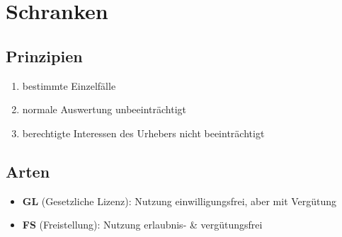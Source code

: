 \documentclass{article}
\begin{document}
\section{Schranken}

\subsection{Prinzipien}
\begin{enumerate}
  \item bestimmte Einzelfälle
  \item normale Auswertung unbeeinträchtigt
  \item berechtigte Interessen des Urhebers nicht beeinträchtigt
\end{enumerate}

\subsection{Arten}
\begin{itemize}
  \item \textbf{GL} (Gesetzliche Lizenz): Nutzung einwilligungsfrei, aber mit Vergütung
  \item \textbf{FS} (Freistellung): Nutzung erlaubnis- \& vergütungsfrei
\end{itemize}
\end{document}
